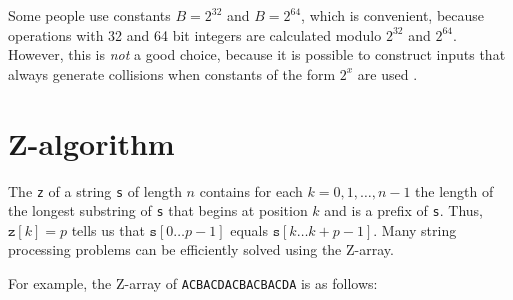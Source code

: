 Some people use constants $B=2^{32}$ and $B=2^{64}$,
which is convenient, because operations with 32 and 64
bit integers are calculated modulo $2^{32}$ and $2^{64}$.
However, this is \emph{not} a good choice, because it is possible
to construct inputs that always generate collisions when
constants of the form $2^x$ are used \cite{pac13}.

\section{Z-algorithm}


The  \texttt{z} of a string \texttt{s}
of length $n$ contains for each $k=0,1,\ldots,n-1$
the length of the longest substring of \texttt{s}
that begins at position $k$ and is a prefix of \texttt{s}.
Thus, $\texttt{z}[k]=p$ tells us that
$\texttt{s}[0 \ldots p-1]$ equals $\texttt{s}[k \ldots k+p-1]$.
Many string processing problems can be efficiently solved
using the Z-array.

For example, the Z-array of
\texttt{ACBACDACBACBACDA} is as follows:

